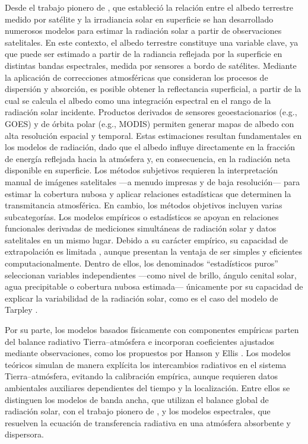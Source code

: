 Desde el trabajo pionero de \cite{Fritz1964}, que estableció la relación entre el albedo terrestre medido por satélite y la irradiancia solar en superficie se han desarrollado numerosos modelos para estimar la radiación solar a partir de observaciones satelitales. En este contexto, el albedo terrestre constituye una variable clave, ya que puede ser estimado a partir de la radiancia reflejada por la superficie en distintas bandas espectrales, medida por sensores a bordo de satélites. Mediante la aplicación de correcciones atmosféricas que consideran los procesos de dispersión y absorción, es posible obtener la reflectancia superficial, a partir de la cual se calcula el albedo como una integración espectral en el rango de la radiación solar incidente. Productos derivados de sensores geoestacionarios (e.g., GOES) y de órbita polar (e.g., MODIS) permiten generar mapas de albedo con alta resolución espacial y temporal. Estas estimaciones resultan fundamentales en los modelos de radiación, dado que el albedo influye directamente en la fracción de energía reflejada hacia la atmósfera y, en consecuencia, en la radiación neta disponible en superficie. 
Los métodos subjetivos requieren la interpretación manual de imágenes satelitales —a menudo impresas y de baja resolución— para estimar la cobertura nubosa y aplicar relaciones estadísticas que determinen la transmitancia atmosférica. En cambio, los métodos objetivos incluyen varias subcategorías. Los modelos empíricos o estadísticos se apoyan en relaciones funcionales derivadas de mediciones simultáneas de radiación solar y datos satelitales en un mismo lugar. Debido a su carácter empírico, su capacidad de extrapolación es limitada \cite{Laguarda2021}, aunque presentan la ventaja de ser simples y eficientes computacionalmente. Dentro de ellos, los denominados “estadísticos puros” seleccionan variables independientes —como nivel de brillo, ángulo cenital solar, agua precipitable o cobertura nubosa estimada— únicamente por su capacidad de explicar la variabilidad de la radiación solar, como es el caso del modelo de Tarpley \cite{Tarpley1979}.

Por su parte, los modelos basados físicamente con componentes empíricas parten del balance radiativo Tierra–atmósfera e incorporan coeficientes ajustados mediante observaciones, como los propuestos por Hanson \cite{Hanson1976} y Ellis \cite{Ellis1978}. Los modelos teóricos simulan de manera explícita los intercambios radiativos en el sistema Tierra–atmósfera, evitando la calibración empírica, aunque requieren datos ambientales auxiliares dependientes del tiempo y la localización. Entre ellos se distinguen los modelos de banda ancha, que utilizan el balance global de radiación solar, con el trabajo pionero de \cite{Gautier1980}, y los modelos espectrales, que resuelven la ecuación de transferencia radiativa en una atmósfera absorbente y dispersora.


